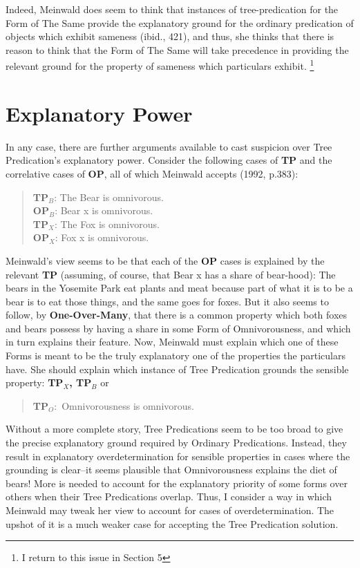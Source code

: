 \documentclass [article] {memoir}
\begin{document}
Indeed, Meinwald does seem to think that instances of tree-predication for the Form of The Same provide the explanatory ground for the ordinary predication of objects which exhibit sameness (ibid., 421), and thus, she thinks that there is reason to think that the Form of The Same will take precedence in providing the relevant ground for the property of sameness which particulars exhibit. \footnote{I return to this issue in Section 5}
\section{Explanatory Power}
In any case, there are further arguments available to cast suspicion over Tree Predication's explanatory power. Consider the following cases of \textbf{TP} and the correlative cases of \textbf{OP}, all of which Meinwald accepts (1992, p.383):
\begin{quote}
\textbf{TP$_B$}: The Bear is omnivorous.\\
\textbf{OP$_B$}:  Bear x is omnivorous.\\
\textbf{TP$_X$}: The Fox is omnivorous.\\
\textbf{OP$_X$}: Fox x is omnivorous.
\end{quote}
Meinwald's view seems to be that each of the \textbf{OP} cases is explained by the relevant \textbf{TP} (assuming, of course, that Bear x has a share of bear-hood): The bears in the Yosemite Park eat plants and meat because part of what it is to be a bear is to eat those things, and the same goes for foxes. But it also seems to follow, by \textbf{One-Over-Many}, that there is a common property which both foxes and bears possess by having a share in some Form of Omnivorousness, and which in turn explains their feature. Now, Meinwald must explain which one of these Forms is meant to be the truly explanatory one of the properties the particulars have. She should explain which instance of Tree Predication grounds the sensible property: \textbf{TP$_X$, TP$_B$} or 
\begin{quote}\textbf{TP$_O:$} Omnivorousness is omnivorous. 
\end{quote}
Without a more complete story, Tree Predications seem to be too broad to give the precise explanatory ground required by Ordinary Predications. Instead, they result in explanatory overdetermination for sensible properties in cases where the grounding is clear--it seems plausible that Omnivorousness explains the diet of bears! More is needed to account for the explanatory priority of some forms over others when their Tree Predications overlap. Thus, I consider a way in which Meinwald may tweak her view to account for cases of overdetermination. The upshot of it is a much weaker case for accepting the Tree Predication solution.
\end{document}
